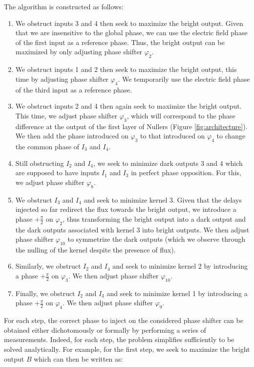 \documentclass{aa}
\begin{document}
            The algorithm is constructed as follows:

            \begin{enumerate}
                \item We obstruct inputs 3 and 4 then seek to maximize the bright output. Given that we are insensitive to the global phase, we can use the electric field phase of the first input as a reference phase. Thus, the bright output can be maximized by only adjusting phase shifter $\varphi_2$.
                \item We obstruct inputs 1 and 2 then seek to maximize the bright output, this time by adjusting phase shifter $\varphi_4$. We temporarily use the electric field phase of the third input as a reference phase.
                \item We obstruct inputs 2 and 4 then again seek to maximize the bright output. This time, we adjust phase shifter $\varphi_3$, which will correspond to the phase difference at the output of the first layer of Nullers (Figure \ref{fig:architecture}). We then add the phase introduced on $\varphi_3$ to that introduced on $\varphi_4$ to change the common phase of $I_3$ and $I_4$.
                \item Still obstructing $I_2$ and $I_4$, we seek to minimize dark outputs 3 and 4 which are supposed to have inputs $I_1$ and $I_3$ in perfect phase opposition. For this, we adjust phase shifter $\varphi_8$.
                \item We obstruct $I_3$ and $I_4$ and seek to minimize kernel 3. Given that the delays injected so far redirect the flux towards the bright output, we introduce a phase $+\frac{\pi}{2}$ on $\varphi_2$, thus transforming the bright output into a dark output and the dark outputs associated with kernel 3 into bright outputs. We then adjust phase shifter $\varphi_10$ to symmetrize the dark outputs (which we observe through the nulling of the kernel despite the presence of flux).
                \item Similarly, we obstruct $I_2$ and $I_4$ and seek to minimize kernel 2 by introducing a phase $+\frac{\pi}{2}$ on $\varphi_3$. We then adjust phase shifter $\varphi_10$.
                \item Finally, we obstruct $I_2$ and $I_3$ and seek to minimize kernel 1 by introducing a phase $+\frac{\pi}{2}$ on $\varphi_4$. We then adjust phase shifter $\varphi_9$.
            \end{enumerate}

            For each step, the correct phase to inject on the considered phase shifter can be obtained either dichotomously or formally by performing a series of measurements. Indeed, for each step, the problem simplifies sufficiently to be solved analytically. For example, for the first step, we seek to maximize the bright output $B$ which can then be written as:
\end{document}
